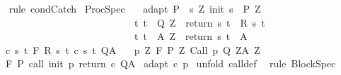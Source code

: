 \begin{isabellebody}
%
\isadelimproof
\ \ %
\endisadelimproof
%
\isatagproof
{}\isamarkupfalse%
\ {\isacharparenleft}rule\ condCatch{\isacharparenright}%
\endisatagproof
{\isafoldproof}%
%
\isadelimproof
\isanewline
%
\endisadelimproof
\isanewline
\isanewline
{}\isamarkupfalse%
\ ProcSpec{\isacharcolon}\isanewline
\ \ \ adapt{\isacharcolon}\ {\isachardoublequoteopen}P\ {\isasymsubseteq}\ {\isacharbraceleft}s{\isachardot}\ {\isasymexists}Z{\isachardot}\ init\ s\ {\isasymin}\ P{\isacharprime}\ Z\ {\isasymand}\ \isanewline
\ \ \ \ \ \ \ \ \ \ \ \ \ \ \ \ \ \ \ \ \ \ \ \ \ \ \ \ \ {\isacharparenleft}{\isasymforall}t{\isachardot}\ t\ {\isasymin}\ Q{\isacharprime}\ Z\ {\isasymlongrightarrow}\ return\ s\ t\ {\isasymin}\ R\ s\ t{\isacharparenright}\ {\isasymand}\isanewline
\ \ \ \ \ \ \ \ \ \ \ \ \ \ \ \ \ \ \ \ \ \ \ \ \ \ \ \ \ {\isacharparenleft}{\isasymforall}t{\isachardot}\ t\ {\isasymin}\ A{\isacharprime}\ Z\ {\isasymlongrightarrow}\ return\ s\ t\ {\isasymin}\ A{\isacharparenright}{\isacharbraceright}{\isachardoublequoteclose}\isanewline
\ \ \ c{\isacharcolon}\ {\isachardoublequoteopen}{\isasymforall}s\ t{\isachardot}\ {\isasymGamma}{\isacharcomma}{\isasymTheta}{\isasymturnstile}\isactrlbsub {\isacharslash}F\isactrlesub \ {\isacharparenleft}R\ s\ t{\isacharparenright}\ {\isacharparenleft}c\ s\ t{\isacharparenright}\ Q{\isacharcomma}A{\isachardoublequoteclose}\isanewline
\ \ \ p{\isacharcolon}\ {\isachardoublequoteopen}{\isasymforall}Z{\isachardot}\ {\isasymGamma}{\isacharcomma}{\isasymTheta}{\isasymturnstile}\isactrlbsub {\isacharslash}F\isactrlesub \ {\isacharparenleft}P{\isacharprime}\ Z{\isacharparenright}\ Call\ p\ {\isacharparenleft}Q{\isacharprime}\ Z{\isacharparenright}{\isacharcomma}{\isacharparenleft}A{\isacharprime}\ Z{\isacharparenright}{\isachardoublequoteclose}\ \isanewline
\ \ \ {\isachardoublequoteopen}{\isasymGamma}{\isacharcomma}{\isasymTheta}{\isasymturnstile}\isactrlbsub {\isacharslash}F\isactrlesub \ P\ {\isacharparenleft}call\ init\ p\ return\ c{\isacharparenright}\ Q{\isacharcomma}A{\isachardoublequoteclose}\isanewline
%
\isadelimproof
%
\endisadelimproof
%
\isatagproof
{}\isamarkupfalse%
\ adapt\ c\ p\isanewline
{}\isamarkupfalse%
\ {\isacharparenleft}unfold\ call{\isacharunderscore}def{\isacharparenright}\ \isanewline
{}\isamarkupfalse%
\ {\isacharparenleft}rule\ BlockSpec{\isacharparenright}%
\endisatagproof
{\isafoldproof}%
%
\isadelimproof
\isanewline
%
\endisadelimproof
\isanewline
{}\isamarkupfalse%

\end{isabellebody}
